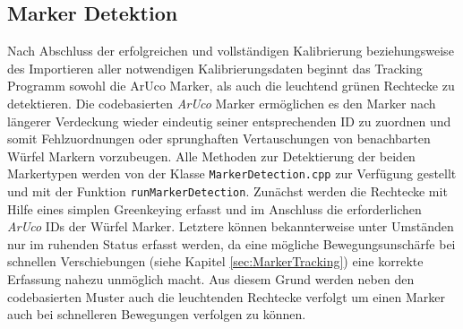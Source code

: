 \subsection{Marker Detektion}

Nach Abschluss der erfolgreichen und vollständigen Kalibrierung beziehungsweise des Importieren aller notwendigen Kalibrierungsdaten beginnt das Tracking Programm sowohl die ArUco Marker, als auch die leuchtend grünen Rechtecke zu detektieren. Die codebasierten \textit{ArUco} Marker ermöglichen es den Marker nach längerer Verdeckung wieder eindeutig seiner entsprechenden ID zu zuordnen und somit Fehlzuordnungen oder sprunghaften Vertauschungen von benachbarten Würfel Markern vorzubeugen. Alle Methoden zur Detektierung der beiden Markertypen werden von der Klasse \texttt{MarkerDetection.cpp} zur Verfügung gestellt und mit der Funktion \texttt{runMarkerDetection}. Zunächst werden die Rechtecke mit Hilfe eines simplen Greenkeying erfasst und im Anschluss die erforderlichen \textit{ArUco} IDs der Würfel Marker. Letztere können bekannterweise unter Umständen nur im ruhenden Status erfasst werden, da eine mögliche Bewegungsunschärfe bei schnellen Verschiebungen (siehe Kapitel \ref{sec:MarkerTracking}) eine korrekte Erfassung nahezu unmöglich macht. 
Aus diesem Grund werden neben den codebasierten Muster auch die leuchtenden Rechtecke verfolgt um einen Marker auch bei schnelleren Bewegungen verfolgen zu können.
